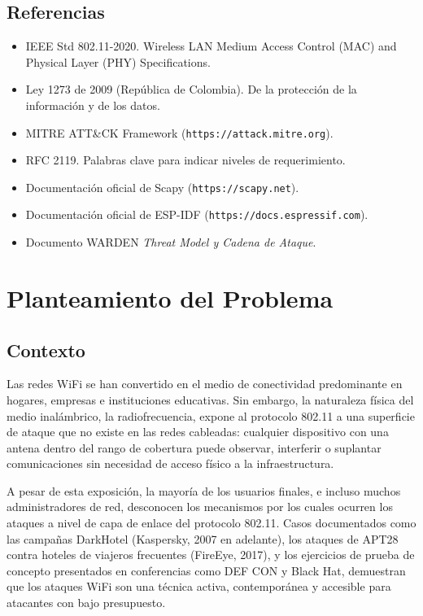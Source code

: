 \documentclass[11pt,a4paper]{article}
\begin{document}
\subsection{Referencias}
\begin{itemize}
  \item IEEE Std 802.11-2020. Wireless LAN Medium Access Control (MAC) and
    Physical Layer (PHY) Specifications.
  \item Ley 1273 de 2009 (República de Colombia). De la protección de la
    información y de los datos.
  \item MITRE ATT\&CK Framework (\texttt{https://attack.mitre.org}).
  \item RFC 2119. Palabras clave para indicar niveles de requerimiento.
  \item Documentación oficial de Scapy (\texttt{https://scapy.net}).
  \item Documentación oficial de ESP-IDF (\texttt{https://docs.espressif.com}).
  \item Documento WARDEN \emph{Threat Model y Cadena de Ataque}.
\end{itemize}

\section{Planteamiento del Problema}

\subsection{Contexto}
Las redes WiFi se han convertido en el medio de conectividad predominante en
hogares, empresas e instituciones educativas. Sin embargo, la naturaleza
física del medio inalámbrico, la radiofrecuencia, expone al protocolo 802.11
a una superficie de ataque que no existe en las redes cableadas: cualquier
dispositivo con una antena dentro del rango de cobertura puede observar,
interferir o suplantar comunicaciones sin necesidad de acceso físico a la
infraestructura.

A pesar de esta exposición, la mayoría de los usuarios finales, e incluso
muchos administradores de red, desconocen los mecanismos por los cuales
ocurren los ataques a nivel de capa de enlace del protocolo 802.11. Casos
documentados como las campañas DarkHotel (Kaspersky, 2007 en adelante), los
ataques de APT28 contra hoteles de viajeros frecuentes (FireEye, 2017), y los
ejercicios de prueba de concepto presentados en conferencias como DEF CON y
Black Hat, demuestran que los ataques WiFi son una técnica activa,
contemporánea y accesible para atacantes con bajo presupuesto.
\end{document}
